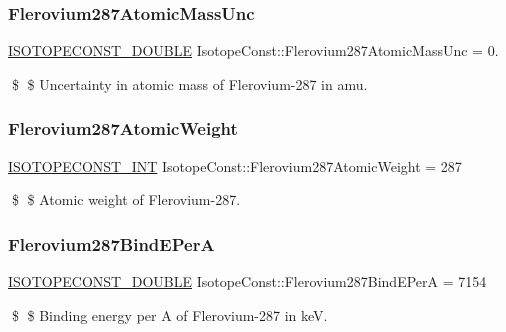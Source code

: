 \subsubsection{\texorpdfstring{Flerovium287\+Atomic\+Mass\+Unc}{Flerovium287AtomicMassUnc}}
{\footnotesize\ttfamily \mbox{\hyperlink{group___isotope_const-_macros_ga8f45a7272ce02c0b4c65c44636ed719a}{I\+S\+O\+T\+O\+P\+E\+C\+O\+N\+S\+T\+\_\+\+D\+O\+U\+B\+LE}} Isotope\+Const\+::\+Flerovium287\+Atomic\+Mass\+Unc = 0.}

\$ \$ Uncertainty in atomic mass of Flerovium-\/287 in amu. \mbox{\label{group___isotope_const-_flerovium-_fl287_gaaa633d78a97821c902f90149c1bca967}} 
\subsubsection{\texorpdfstring{Flerovium287\+Atomic\+Weight}{Flerovium287AtomicWeight}}
{\footnotesize\ttfamily \mbox{\hyperlink{group___isotope_const-_macros_ga5f18360b3e99483a35c32d789e62621c}{I\+S\+O\+T\+O\+P\+E\+C\+O\+N\+S\+T\+\_\+\+I\+NT}} Isotope\+Const\+::\+Flerovium287\+Atomic\+Weight = 287}

\$ \$ Atomic weight of Flerovium-\/287. \mbox{\label{group___isotope_const-_flerovium-_fl287_ga0780917e9d41ee4a9a3b6b6103810810}} 
\subsubsection{\texorpdfstring{Flerovium287\+Bind\+E\+PerA}{Flerovium287BindEPerA}}
{\footnotesize\ttfamily \mbox{\hyperlink{group___isotope_const-_macros_ga8f45a7272ce02c0b4c65c44636ed719a}{I\+S\+O\+T\+O\+P\+E\+C\+O\+N\+S\+T\+\_\+\+D\+O\+U\+B\+LE}} Isotope\+Const\+::\+Flerovium287\+Bind\+E\+PerA = 7154}

\$ \$ Binding energy per A of Flerovium-\/287 in keV. \mbox{\label{group___isotope_const-_flerovium-_fl287_gaabb7b319905dca21e3db7a6fd10c4bf3}} 
